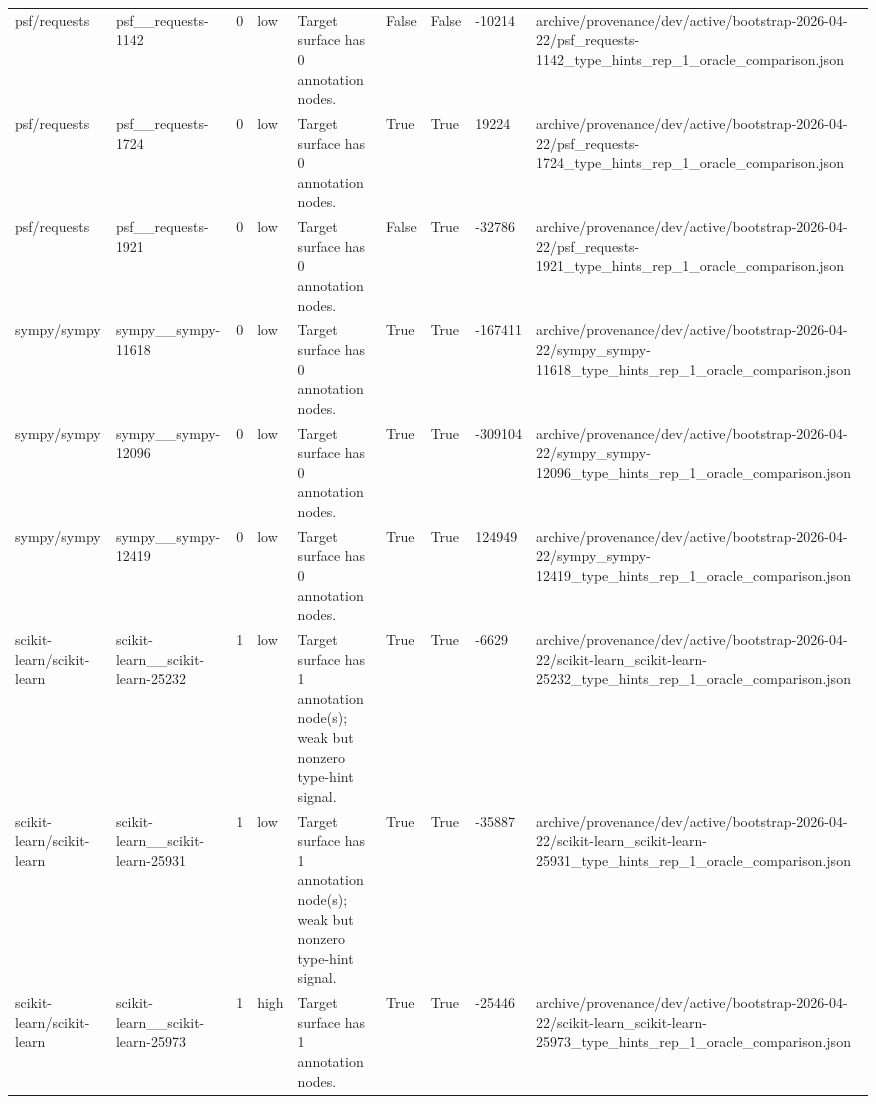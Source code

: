 \begin{tabular}{lllllllll}
psf/requests & psf\_\_requests-1142 & 0 & low & Target surface has 0 annotation nodes. & False & False & -10214 & archive/provenance/dev/active/bootstrap-2026-04-22/psf\_requests-1142\_type\_hints\_rep\_1\_oracle\_comparison.json \\
psf/requests & psf\_\_requests-1724 & 0 & low & Target surface has 0 annotation nodes. & True & True & 19224 & archive/provenance/dev/active/bootstrap-2026-04-22/psf\_requests-1724\_type\_hints\_rep\_1\_oracle\_comparison.json \\
psf/requests & psf\_\_requests-1921 & 0 & low & Target surface has 0 annotation nodes. & False & True & -32786 & archive/provenance/dev/active/bootstrap-2026-04-22/psf\_requests-1921\_type\_hints\_rep\_1\_oracle\_comparison.json \\
sympy/sympy & sympy\_\_sympy-11618 & 0 & low & Target surface has 0 annotation nodes. & True & True & -167411 & archive/provenance/dev/active/bootstrap-2026-04-22/sympy\_sympy-11618\_type\_hints\_rep\_1\_oracle\_comparison.json \\
sympy/sympy & sympy\_\_sympy-12096 & 0 & low & Target surface has 0 annotation nodes. & True & True & -309104 & archive/provenance/dev/active/bootstrap-2026-04-22/sympy\_sympy-12096\_type\_hints\_rep\_1\_oracle\_comparison.json \\
sympy/sympy & sympy\_\_sympy-12419 & 0 & low & Target surface has 0 annotation nodes. & True & True & 124949 & archive/provenance/dev/active/bootstrap-2026-04-22/sympy\_sympy-12419\_type\_hints\_rep\_1\_oracle\_comparison.json \\
scikit-learn/scikit-learn & scikit-learn\_\_scikit-learn-25232 & 1 & low & Target surface has 1 annotation node(s); weak but nonzero type-hint signal. & True & True & -6629 & archive/provenance/dev/active/bootstrap-2026-04-22/scikit-learn\_scikit-learn-25232\_type\_hints\_rep\_1\_oracle\_comparison.json \\
scikit-learn/scikit-learn & scikit-learn\_\_scikit-learn-25931 & 1 & low & Target surface has 1 annotation node(s); weak but nonzero type-hint signal. & True & True & -35887 & archive/provenance/dev/active/bootstrap-2026-04-22/scikit-learn\_scikit-learn-25931\_type\_hints\_rep\_1\_oracle\_comparison.json \\
scikit-learn/scikit-learn & scikit-learn\_\_scikit-learn-25973 & 1 & high & Target surface has 1 annotation nodes. & True & True & -25446 & archive/provenance/dev/active/bootstrap-2026-04-22/scikit-learn\_scikit-learn-25973\_type\_hints\_rep\_1\_oracle\_comparison.json \\

\end{tabular}
